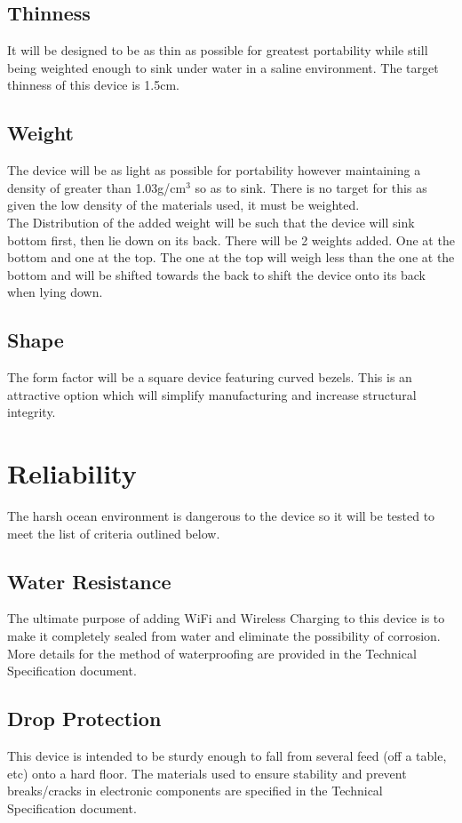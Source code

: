 \documentclass{article}
\begin{document}
\subsection{Thinness}
It will be designed to be as thin as possible for greatest portability while still being weighted enough to sink under water in a saline environment. The target thinness of this device is 1.5cm.

\subsection{Weight}
The device will be as light as possible for portability however maintaining a density of greater than 1.03g/cm$^3$ so as to sink. There is no target for this as given the low density of the materials used, it must be weighted.\\[12pt]
The Distribution of the added weight will be such that the device will sink bottom first, then lie down on its back. There will be 2 weights added. One at the bottom and one at the top. The one at the top will weigh less than the one at the bottom and will be shifted towards the back to shift the device onto its back when lying down.


\subsection{Shape}
The form factor will be a square device featuring curved bezels. This is an attractive option which will simplify manufacturing and increase structural integrity. 


\pagebreak


\section{Reliability}%
The harsh ocean environment is dangerous to the device so it will be tested to meet the list of criteria outlined below.

\subsection{Water Resistance}
The ultimate purpose of adding WiFi and Wireless Charging to this device is to make it completely sealed from water and eliminate the possibility of corrosion. More details for the method of waterproofing are provided in the Technical Specification document.

\subsection{Drop Protection}
This device is intended to be sturdy enough to fall from several feed (off a table, etc) onto a hard floor. The materials used to ensure stability and prevent breaks/cracks in electronic components are specified in the Technical Specification document.
\end{document}
